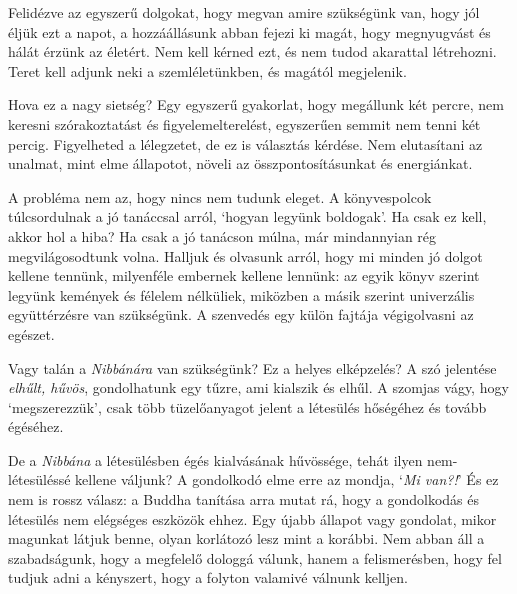 Felidézve az egyszerű dolgokat, hogy megvan amire szükségünk van, hogy
jól éljük ezt a napot, a hozzáállásunk abban fejezi ki magát, hogy
megnyugvást és hálát érzünk az életért. Nem kell kérned ezt, és nem
tudod akarattal létrehozni. Teret kell adjunk neki a szemléletünkben, és
magától megjelenik.

Hova ez a nagy sietség? Egy egyszerű gyakorlat, hogy megállunk két
percre, nem keresni szórakoztatást és figyelemelterelést, egyszerűen
semmit nem tenni két percig. Figyelheted a lélegzetet, de ez is
választás kérdése. Nem elutasítani az unalmat, mint elme állapotot,
növeli az összpontosításunkat és energiánkat.

A probléma nem az, hogy nincs nem tudunk eleget. A könyvespolcok
túlcsordulnak a jó tanáccsal arról, `hogyan legyünk boldogak'. Ha csak
ez kell, akkor hol a hiba? Ha csak a jó tanácson múlna, már mindannyian
rég megvilágosodtunk volna. Halljuk és olvasunk arról, hogy mi minden jó
dolgot kellene tennünk, milyenféle embernek kellene lennünk: az egyik
könyv szerint legyünk kemények és félelem nélküliek, miközben a másik
szerint univerzális együttérzésre van szükségünk. A szenvedés egy külön
fajtája végigolvasni az egészet.

Vagy talán a \emph{Nibbánára} van szükségünk? Ez a helyes elképzelés? A
szó jelentése \emph{elhűlt, hűvös}, gondolhatunk egy tűzre, ami kialszik
és elhűl. A szomjas vágy, hogy `megszerezzük', csak több tüzelőanyagot
jelent a létesülés hőségéhez és tovább égéséhez.

De a \emph{Nibbána} a létesülésben égés kialvásának hűvössége, tehát
ilyen nem-létesüléssé kellene váljunk? A gondolkodó elme erre az mondja,
`\emph{Mi van?!}' És ez nem is rossz válasz: a Buddha tanítása arra
mutat rá, hogy a gondolkodás és létesülés nem elégséges eszközök ehhez.
Egy újabb állapot vagy gondolat, mikor magunkat látjuk benne, olyan
korlátozó lesz mint a korábbi. Nem abban áll a szabadságunk, hogy a
megfelelő dologgá válunk, hanem a felismerésben, hogy fel tudjuk adni a
kényszert, hogy a folyton valamivé válnunk kelljen.

\clearpage
\figurepagelayout

